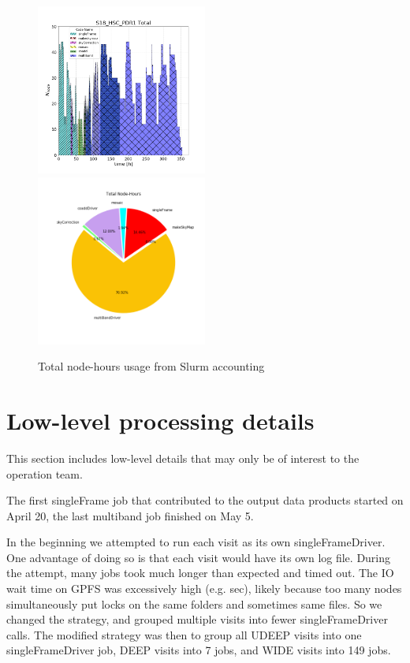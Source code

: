 \begin{figure}[h]
\includegraphics[width=0.50\textwidth]{usage-S18_HSC_PDR1_Total.png}
\includegraphics[width=0.50\textwidth]{PDR1_Total_pie.png}
\caption{Total node-hours usage from Slurm accounting}
\label{figs}
\end{figure}


\section{Low-level processing details}
This section includes low-level details that may only be of interest to the operation team.

The first singleFrame job that contributed to the output data products started on April 20, the last multiband job finished on May 5.

In the beginning we attempted to run each visit as its own singleFrameDriver. One advantage of doing so is that each visit would have its own log file. During the attempt, many jobs took much longer than expected and timed out. The IO wait time on GPFS was excessively high (e.g.  sec), likely because too many nodes simultaneously put locks on the same folders and sometimes same files. So we changed the strategy, and grouped multiple visits into fewer singleFrameDriver calls. The modified strategy was then to group all UDEEP visits into one singleFrameDriver job, DEEP visits into 7 jobs, and WIDE visits into 149 jobs.


